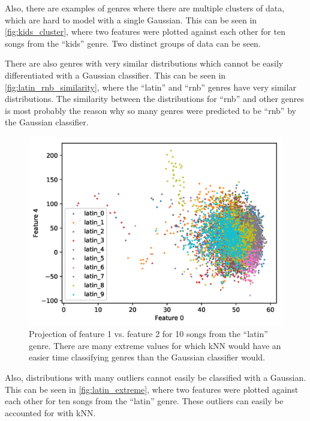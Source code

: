 \documentclass[a4paper,titlepage]{article}
\begin{document}
	Also, there are examples of genres where there are multiple clusters of data, which are hard to model with a single Gaussian. This can be seen in \autoref{fig:kids_cluster}, where two features were plotted against each other for ten songs from the ``kids'' genre. Two distinct groups of data can be seen.
	

	There are also genres with very similar distributions which cannot be easily differentiated with a Gaussian classifier. This can be seen in \autoref{fig:latin_rnb_similarity}, where the ``latin'' and ``rnb'' genres have very similar distributions. The similarity between the distributions for ``rnb'' and other genres is most probably the reason why so many genres were predicted to be ``rnb'' by the Gaussian classifier.
	
	\begin{figure}[!htb]
		\centering
		\includegraphics[width=\columnwidth]{plots/latin_extreme.png}
		\caption
		{Projection of feature 1 vs. feature 2 for 10 songs from the ``latin'' genre. There are many extreme values for which kNN would have an easier time classifying genres than the Gaussian classifier would.}
		\label{fig:latin_extreme}
	\end{figure}
	
	Also, distributions with many outliers cannot easily be classified with a Gaussian. This can be seen in \autoref{fig:latin_extreme}, where two features were plotted against each other for ten songs from the ``latin'' genre. These outliers can easily be accounted for with kNN.

	
\end{document}
